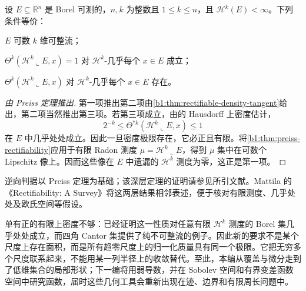 \begin{theorem}[可整流性的密度判据]\label{b1:thm:rectifiability-density-criterion}
设 \(E\subseteq\mathbb R^n\) 是 Borel 可测的，\(n,k\) 为整数且 \(1\leq k\leq n\)，且 \(\mathcal H^k(E)<\infty\)。下列条件等价：
\begin{equivalences}
\item\label{b1:item:density-criterion-rectifiable}\(E\) 可数 \(k\) 维可整流；
\item\label{b1:item:density-criterion-one}\(\Theta^k(\mathcal H^k\llcorner E,x)=1\) 对 \(\mathcal H^k\)-几乎每个 \(x\in E\) 成立；
\item\label{b1:item:density-criterion-exists}\(\Theta^k(\mathcal H^k\llcorner E,x)\) 对 \(\mathcal H^k\)-几乎每个 \(x\in E\) 存在。
\end{equivalences}
\end{theorem}
\begin{proof}[由 Preiss 定理推出]
第一项推出第二项由\cref{b1:thm:rectifiable-density-tangent}给出，第二项当然推出第三项。若第三项成立，由的 Hausdorff 上密度估计，
\[
 2^{-k}\leq\Theta^{*k}(\mathcal H^k\llcorner E,x)\leq1
\]
在 \(E\) 中几乎处处成立。因此一旦密度极限存在，它必正且有限。将\cref{b1:thm:preiss-rectifiability}应用于有限 Radon 测度 \(\mu=\mathcal H^k\llcorner E\)，得到 \(\mu\) 集中在可数个 Lipschitz 像上。因而这些像在 \(E\) 中遗漏的 \(\mathcal H^k\) 测度为零，这正是第一项。
\end{proof}

逆向判据以 Preiss 定理为基础；该深层定理的证明请参见所引文献。Mattila 的《Rectifiability: A Survey》\cite[Theorems 4.10--4.11]{Mattila2023Rectifiability}将这两层结果相邻表述，便于核对有限测度、几乎处处及欧氏空间等假设。

\ProseParagraphBreak

单有正的有限上密度不够：已经证明这一性质对任意有限 \(\mathcal H^k\) 测度的 Borel 集几乎处处成立，而四角 Cantor 集提供了纯不可整流的例子。因此新的要求不是某个尺度上存在面积，而是所有趋零尺度上的归一化质量具有同一个极限。它把无穷多个尺度联系起来，不能用某一列半径上的收敛替代。至此，本编从覆盖与微分走到了低维集合的局部形状；下一编将用弱导数，并在 Sobolev 空间和有界变差函数空间中研究函数，届时这些几何工具会重新出现在迹、边界和有限周长问题中。

